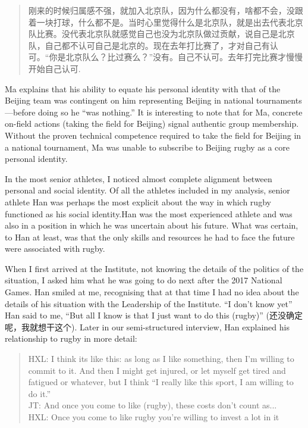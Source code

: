 \begin{CJK}{UTF8}{gbsn}
    \begin{quote}
      刚来的时候归属感不强，就加入北京队，因为什么都没有，啥都不会，没跟着一块打球，什么都不是。当时心里觉得什么是北京队，就是出去代表北京队比赛。没代表北京队就感觉自己也没为北京队做过贡献，说自己是北京队，自己都不认可自己是北京的。现在去年打比赛了，才对自己有认可。“你是北京队么？比过赛么？”没有。自己不认可。去年打完比赛才慢慢开始自己认可.
    \end{quote}

Ma explains that his ability to equate his personal identity with that of the Beijing team was contingent on him representing Beijing in national tournaments---before doing so he ``was nothing.''  It is interesting to note that for Ma, concrete on-field actions (taking the field for Beijing) signal authentic group membership.  Without the proven technical competence required to take the field for Beijing in a national tournament, Ma was unable to subscribe to Beijing rugby as a core personal identity.

In the most senior athletes, I noticed almost complete alignment between personal and social identity.  Of all the athletes included in my analysis, senior athlete Han was perhaps the most explicit about the way in which rugby functioned as his social identity.Han was the most experienced athlete and was also in a position in which he was uncertain about his future. What was certain, to Han at least, was that the only skills and resources he had to face the future were associated with rugby.

When I first arrived at the Institute, not knowing the details of the politics of the situation, I asked him what he was going to do next after the 2017 National Games.  Han smiled at me, recognising that at that time I had no idea about the details of his situation with the Leadership of the Institute. ``I don't know yet'' Han said to me, ``But all I know is that I just want to do this (rugby)'' (还没确定呢，我就想干这个).  Later in our semi-structured interview, Han explained his relationship to rugby in more detail:
          \begin{quote}
            HXL: I think its like this: as long as I like something, then I'm willing to commit to it.  And then I might get injured, or let myself get tired and fatigued or whatever, but I think ``I really like this sport, I am willing to do it.''\\
            JT: And once you come to like (rugby), these costs don't count as...\\
            HXL: Once you come to like rugby you're willing to invest a lot in it
          \end{quote}


\end{CJK}
